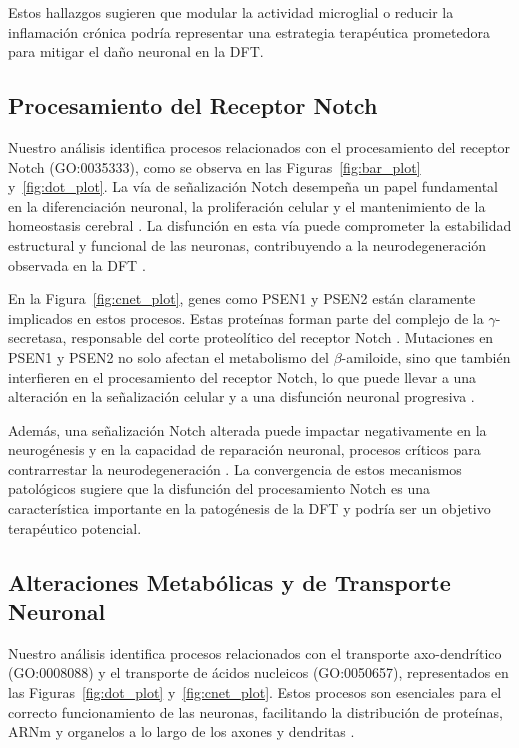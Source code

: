 Estos hallazgos sugieren que modular la actividad microglial o reducir la inflamación crónica podría representar una estrategia terapéutica prometedora para mitigar el daño neuronal en la DFT.


\subsection{Procesamiento del Receptor Notch}

Nuestro análisis identifica procesos relacionados con el procesamiento del receptor Notch (GO:0035333), como se observa en las Figuras~\ref{fig:bar_plot} y~\ref{fig:dot_plot}. La vía de señalización Notch desempeña un papel fundamental en la diferenciación neuronal, la proliferación celular y el mantenimiento de la homeostasis cerebral \cite{kopan2009canonical}. La disfunción en esta vía puede comprometer la estabilidad estructural y funcional de las neuronas, contribuyendo a la neurodegeneración observada en la DFT \cite{abbott2019notch}.

En la Figura~\ref{fig:cnet_plot}, genes como PSEN1 y PSEN2 están claramente implicados en estos procesos. Estas proteínas forman parte del complejo de la  \(\gamma\)-secretasa, responsable del corte proteolítico del receptor Notch \cite{de2002presenilins}. Mutaciones en PSEN1 y PSEN2 no solo afectan el metabolismo del \(\beta\)-amiloide, sino que también interfieren en el procesamiento del receptor Notch, lo que puede llevar a una alteración en la señalización celular y a una disfunción neuronal progresiva \cite{sherrington1995cloning}.

Además, una señalización Notch alterada puede impactar negativamente en la neurogénesis y en la capacidad de reparación neuronal, procesos críticos para contrarrestar la neurodegeneración \cite{ables2011notch}. La convergencia de estos mecanismos patológicos sugiere que la disfunción del procesamiento Notch es una característica importante en la patogénesis de la DFT y podría ser un objetivo terapéutico potencial.


\subsection{Alteraciones Metabólicas y de Transporte Neuronal}

Nuestro análisis identifica procesos relacionados con el transporte axo-dendrítico (GO:0008088) y el transporte de ácidos nucleicos (GO:0050657), representados en las Figuras~\ref{fig:dot_plot} y~\ref{fig:cnet_plot}. Estos procesos son esenciales para el correcto funcionamiento de las neuronas, facilitando la distribución de proteínas, ARNm y organelos a lo largo de los axones y dendritas \cite{goldstein2001axonal}.

